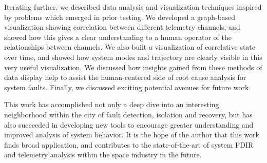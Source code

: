 Iterating further, we described data analysis and visualization techniques inspired by problems which emerged in prior testing. We developed a graph-based visualization showing correlation between different telemetry channels, and showed how this gives a clear understanding to a human operator of the relationships between channels. We also built a visualization of correlative state over time, and showed how system modes and trajectory are clearly visible in this very useful visualization. We discussed how insights gained from these methods of data display help to assist the human-centered side of root cause analysis for system faults. Finally, we discussed exciting potential avenues for future work.

This work has accomplished not only a deep dive into an interesting neighborhood within the city of fault detection, isolation and recovery, but has also succeeded in developing new tools to encourage greater understanding and improved analysis of system behavior. It is the hope of the author that this work finds broad application, and contributes to the state-of-the-art of system FDIR and telemetry analysis within the space industry in the future.